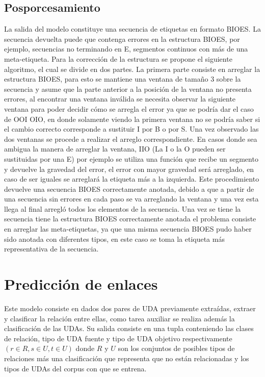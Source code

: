 \subsection{Posporcesamiento}

La salida del modelo constituye una secuencia de etiquetas en formato BIOES. La secuencia devuelta puede que contenga
errores en la estructura BIOES, por ejemplo, secuencias no terminando en E, segmentos continuos con más de una meta-etiqueta.
Para la corrección de la estructura se propone el siguiente algoritmo, el cual se divide en dos partes. La primera
parte consiste en arreglar la estructura BIOES, para esto se mantiene una ventana de tamaño
3 sobre la secuencia y asume que la parte anterior a la posición de la ventana no presenta errores, al encontrar una
ventana inválida se necesita observar la siguiente ventana para poder decidir cómo se arregla el error ya que se
podría dar el caso de OOI OIO, en donde solamente viendo la primera ventana no se podría saber si el cambio 
correcto corresponde a sustituir I por B o por S. Una vez observado las dos ventanas se procede a realizar el 
arreglo correspondiente. En casos donde sea ambigua la manera de arreglar la ventana, IIO (La I o la O pueden ser 
sustituidas por una E) por ejemplo se utiliza una función que recibe un segmento y devuelve la gravedad del error,
el error con mayor gravedad será arreglado, en caso de ser iguales se arreglará la etiqueta más a la izquierda.
Este procedimiento devuelve una secuencia BIOES correctamente anotada, debido a que a partir de una secuencia sin 
errores en cada paso se va arreglando la ventana y una vez esta llega al final arregló todos los elementos de la secuencia.
Una vez se tiene la secuencia tiene la estructura BIOES correctamente anotada el problema
consiste en arreglar las meta-etiquetas, ya que una misma secuencia BIOES pudo haber sido anotada con diferentes
tipos, en este caso se toma la etiqueta más representativa de la secuencia.

\section{Predicción de enlaces}

Este modelo consiste en dados dos pares de UDA previamente extraídas, 
extraer y clasificar la relación entre ellas, como tarea auxiliar se realiza además la clasificación 
de las UDAs. Su salida consiste en una tupla conteniendo las clases de relación, tipo de UDA fuente y 
tipo de UDA objetivo respectivamente $(r \in R, s \in U, t \in U)$ donde $R$ y $U$ son los conjuntos de 
posibles tipos de relaciones más una clasificación que representa que no están relacionadas y los tipos de UDAs 
del corpus con que se entrena.

